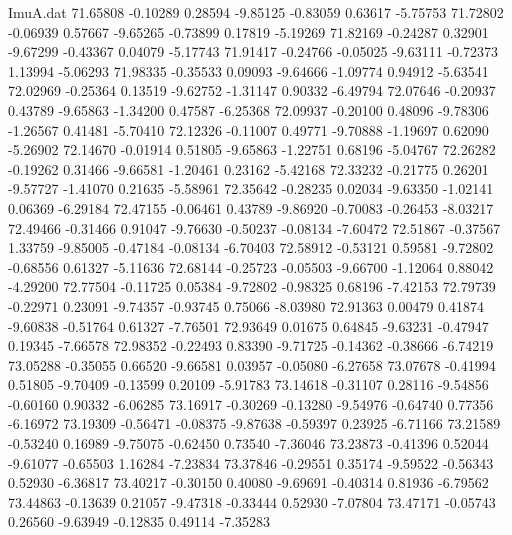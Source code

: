 \begin{filecontents}{ImuA.dat}
  71.65808   -0.10289    0.28594   -9.85125   -0.83059    0.63617   -5.75753
  71.72802   -0.06939    0.57667   -9.65265   -0.73899    0.17819   -5.19269
  71.82169   -0.24287    0.32901   -9.67299   -0.43367    0.04079   -5.17743
  71.91417   -0.24766   -0.05025   -9.63111   -0.72373    1.13994   -5.06293
  71.98335   -0.35533    0.09093   -9.64666   -1.09774    0.94912   -5.63541
  72.02969   -0.25364    0.13519   -9.62752   -1.31147    0.90332   -6.49794
  72.07646   -0.20937    0.43789   -9.65863   -1.34200    0.47587   -6.25368
  72.09937   -0.20100    0.48096   -9.78306   -1.26567    0.41481   -5.70410
  72.12326   -0.11007    0.49771   -9.70888   -1.19697    0.62090   -5.26902
  72.14670   -0.01914    0.51805   -9.65863   -1.22751    0.68196   -5.04767
  72.26282   -0.19262    0.31466   -9.66581   -1.20461    0.23162   -5.42168
  72.33232   -0.21775    0.26201   -9.57727   -1.41070    0.21635   -5.58961
  72.35642   -0.28235    0.02034   -9.63350   -1.02141    0.06369   -6.29184
  72.47155   -0.06461    0.43789   -9.86920   -0.70083   -0.26453   -8.03217
  72.49466   -0.31466    0.91047   -9.76630   -0.50237   -0.08134   -7.60472
  72.51867   -0.37567    1.33759   -9.85005   -0.47184   -0.08134   -6.70403
  72.58912   -0.53121    0.59581   -9.72802   -0.68556    0.61327   -5.11636
  72.68144   -0.25723   -0.05503   -9.66700   -1.12064    0.88042   -4.29200
  72.77504   -0.11725    0.05384   -9.72802   -0.98325    0.68196   -7.42153
  72.79739   -0.22971    0.23091   -9.74357   -0.93745    0.75066   -8.03980
  72.91363    0.00479    0.41874   -9.60838   -0.51764    0.61327   -7.76501
  72.93649    0.01675    0.64845   -9.63231   -0.47947    0.19345   -7.66578
  72.98352   -0.22493    0.83390   -9.71725   -0.14362   -0.38666   -6.74219
  73.05288   -0.35055    0.66520   -9.66581    0.03957   -0.05080   -6.27658
  73.07678   -0.41994    0.51805   -9.70409   -0.13599    0.20109   -5.91783
  73.14618   -0.31107    0.28116   -9.54856   -0.60160    0.90332   -6.06285
  73.16917   -0.30269   -0.13280   -9.54976   -0.64740    0.77356   -6.16972
  73.19309   -0.56471   -0.08375   -9.87638   -0.59397    0.23925   -6.71166
  73.21589   -0.53240    0.16989   -9.75075   -0.62450    0.73540   -7.36046
  73.23873   -0.41396    0.52044   -9.61077   -0.65503    1.16284   -7.23834
  73.37846   -0.29551    0.35174   -9.59522   -0.56343    0.52930   -6.36817
  73.40217   -0.30150    0.40080   -9.69691   -0.40314    0.81936   -6.79562
  73.44863   -0.13639    0.21057   -9.47318   -0.33444    0.52930   -7.07804
  73.47171   -0.05743    0.26560   -9.63949   -0.12835    0.49114   -7.35283

\end{filecontents}
